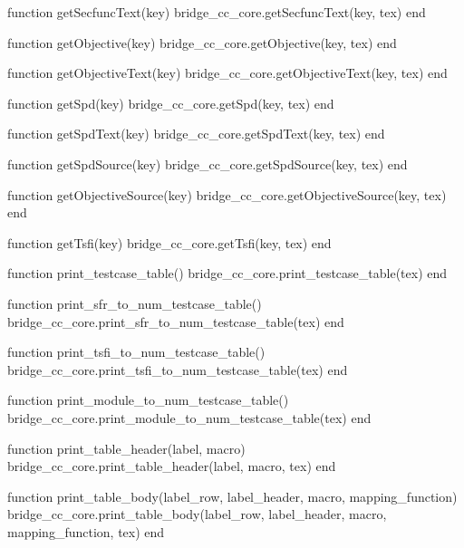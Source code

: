 \begin{luacode}
  function getSecfuncText(key)
    bridge_cc_core.getSecfuncText(key, tex)
  end

  function getObjective(key)
    bridge_cc_core.getObjective(key, tex)
  end

  function getObjectiveText(key)
    bridge_cc_core.getObjectiveText(key, tex)
  end

  function getSpd(key)
    bridge_cc_core.getSpd(key, tex)
  end

  function getSpdText(key)
    bridge_cc_core.getSpdText(key, tex)
  end

  function getSpdSource(key)
    bridge_cc_core.getSpdSource(key, tex)
  end

  function getObjectiveSource(key)
    bridge_cc_core.getObjectiveSource(key, tex)
  end

  function getTsfi(key)
    bridge_cc_core.getTsfi(key, tex)
  end

  function print_testcase_table()
    bridge_cc_core.print_testcase_table(tex)
  end

  function print_sfr_to_num_testcase_table()
    bridge_cc_core.print_sfr_to_num_testcase_table(tex)
  end

  function print_tsfi_to_num_testcase_table()
    bridge_cc_core.print_tsfi_to_num_testcase_table(tex)
  end

  function print_module_to_num_testcase_table()
    bridge_cc_core.print_module_to_num_testcase_table(tex)
  end

  function print_table_header(label, macro)
    bridge_cc_core.print_table_header(label, macro, tex)
  end

  function print_table_body(label_row, label_header, macro, mapping_function)
    bridge_cc_core.print_table_body(label_row, label_header, macro, mapping_function, tex)
  end

\end{luacode}
